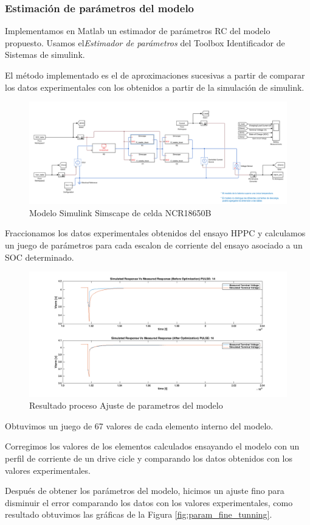 \documentclass[10pt]{beamer}
\theoremstyle{remark}
\theoremstyle{definition}
\begin{document}
\begin{frame}[allowframebreaks]
  \frametitle{Estimación de parámetros del modelo}

  Implementamos en Matlab un estimador de parámetros RC del 
  modelo propuesto. Usamos el\emph{Estimador de parámetros} del Toolbox 
  Identificador de Sistemas de simulink.

  El método implementado es el de aproximaciones sucesivas a partir de comparar 
  los datos experimentales con los obtenidos a partir de la simulación de 
  simulink.

  \begin{figure}
	\centering
	\includegraphics[width=0.9\linewidth]{images/Modelo_celda_simulink.png}
	\caption{Modelo Simulink Simscape de celda  NCR18650B }
	\label{fig:simulink_celda}
  \end{figure}

  Fraccionamos los datos experimentales obtenidos del ensayo HPPC y calculamos 
  un juego de parámetros para cada escalon de corriente del ensayo asociado a 
  un SOC determinado.

  \begin{figure}
	\centering
	\includegraphics[width=0.9\linewidth]{images/Optimizacion.png}
	\caption{Resultado proceso Ajuste de parametros del modelo}
	\label{fig:RC_Opt}
  \end{figure}

  Obtuvimos un juego de 67 valores de cada elemento interno del modelo.


  Corregimos los valores de los elementos calculados ensayando el modelo con un 
  perfil de corriente de un drive cicle y comparando los datos obtenidos con 
  los valores experimentales.


\end{frame}

\begin{frame}[allowframebreaks]
	Después de obtener los parámetros del modelo, hicimos un ajuste fino para
	disminuir el error comparando los datos con los valores experimentales, como
	resultado obtuvimos las gráficas de la Figura \ref{fig:param_fine_tunning}.
\end{frame}
\end{document}
